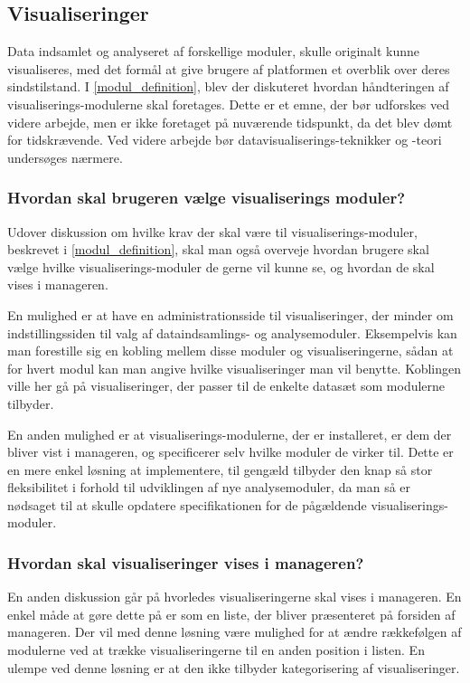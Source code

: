 \subsection{Visualiseringer}
Data indsamlet og analyseret af forskellige moduler, skulle originalt kunne visualiseres, med det formål at give brugere af platformen et overblik over deres sindstilstand.
I \cref{modul_definition}, blev der diskuteret hvordan håndteringen af visualiserings-modulerne skal foretages.
Dette er et emne, der bør udforskes ved videre arbejde, men er ikke foretaget på nuværende tidspunkt, da det blev dømt for tidskrævende.
Ved videre arbejde bør datavisualiserings-teknikker og -teori undersøges nærmere.

\subsubsection{Hvordan skal brugeren vælge visualiserings moduler?}
Udover diskussion om hvilke krav der skal være til visualiserings-moduler, beskrevet i \cref{modul_definition}, skal man også overveje hvordan brugere skal vælge hvilke visualiserings-moduler de gerne vil kunne se, og hvordan de skal vises i manageren.

En mulighed er at have en administrationsside til visualiseringer, der minder om indstillingssiden til valg af dataindsamlings- og analysemoduler.
Eksempelvis kan man forestille sig en kobling mellem disse moduler og visualiseringerne, sådan at for hvert modul kan man angive hvilke visualiseringer man vil benytte.
Koblingen ville her gå på visualiseringer, der passer til de enkelte datasæt som modulerne tilbyder.

En anden mulighed er at visualiserings-modulerne, der er installeret, er dem der bliver vist i manageren, og specificerer selv hvilke moduler de virker til.
Dette er en mere enkel løsning at implementere, til gengæld tilbyder den knap så stor fleksibilitet i forhold til udviklingen af nye analysemoduler, da man så er nødsaget til at skulle opdatere specifikationen for de pågældende visualiserings-moduler.

\subsubsection{Hvordan skal visualiseringer vises i manageren?}
En anden diskussion går på hvorledes visualiseringerne skal vises i manageren.
En enkel måde at gøre dette på er som en liste, der bliver præsenteret på forsiden af manageren.
Der vil med denne løsning være mulighed for at ændre rækkefølgen af modulerne ved at trække visualiseringerne til en anden position i listen.
En ulempe ved denne løsning er at den ikke tilbyder kategorisering af visualiseringer.

